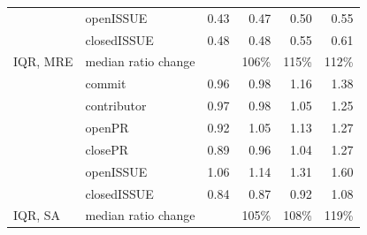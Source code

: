 \documentclass[smallextended]{svjour3}
\begin{document}
\begin{table}[!t]
\begin{adjustbox}{max width=0.96\textwidth}
\begin{tabular}{llrrrr}
                              & openISSUE                                   & 0.43                                         & 0.47                          & 0.50                          & 0.55                          \\
                              & closedISSUE                                 & 0.48                                         & 0.48                          & 0.55                          & 0.61                          \\
\multirow{-7}{*}{IQR, MRE}    & \cellcolor[HTML]{CCCCCC}median ratio change & \multicolumn{1}{l}{\cellcolor[HTML]{CCCCCC}} & \cellcolor[HTML]{CCCCCC}106\% & \cellcolor[HTML]{CCCCCC}115\% & \cellcolor[HTML]{CCCCCC}112\% \\ \hline
                              & commit                                      & 0.96                                         & 0.98                          & 1.16                          & 1.38                          \\
                              & contributor                                 & 0.97                                         & 0.98                          & 1.05                          & 1.25                          \\
                              & openPR                                      & 0.92                                         & 1.05                          & 1.13                          & 1.27                          \\
                              & closePR                                     & 0.89                                         & 0.96                          & 1.04                          & 1.27                          \\
                              & openISSUE                                   & 1.06                                         & 1.14                          & 1.31                          & 1.60                          \\
                              & closedISSUE                                 & 0.84                                         & 0.87                          & 0.92                          & 1.08                          \\
\multirow{-7}{*}{IQR, SA}     & \cellcolor[HTML]{CCCCCC}median ratio change & \multicolumn{1}{l}{\cellcolor[HTML]{CCCCCC}} & \cellcolor[HTML]{CCCCCC}105\% & \cellcolor[HTML]{CCCCCC}108\% & \cellcolor[HTML]{CCCCCC}119\% \\ \hline
\end{tabular}
\end{adjustbox}
\end{table}
\end{document}
